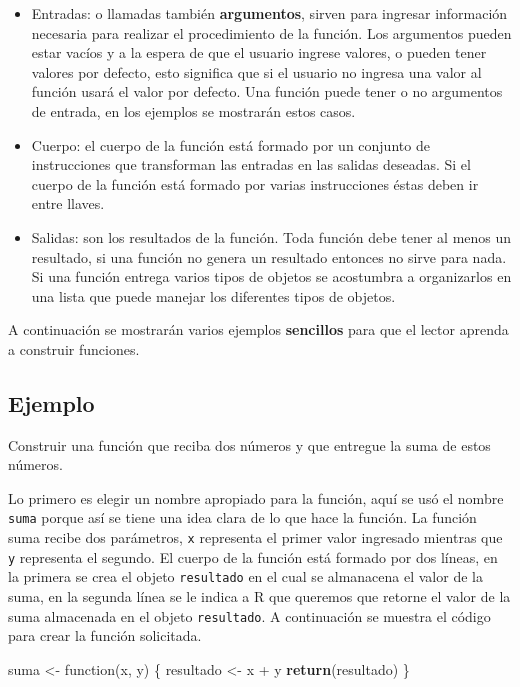 \documentclass[10pt,]{krantz}
\makeatletter
\newenvironment{Shaded}{\begin{snugshade}}{\end{snugshade}}
\newcommand{\KeywordTok}[1]{\textcolor[rgb]{0.13,0.29,0.53}{\textbf{{#1}}}}
\newcommand{\StringTok}[1]{\textcolor[rgb]{0.31,0.60,0.02}{{#1}}}
\newcommand{\NormalTok}[1]{{#1}}
\providecommand{\tightlist}{%
  \setlength{\itemsep}{0pt}\setlength{\parskip}{0pt}}
\let\proglang=\textsf
\newenvironment{kframe}{%
\medskip{}
\setlength{\fboxsep}{.8em}
 \def\at@end@of@kframe{}%
 \ifinner\ifhmode%
  \def\at@end@of@kframe{\end{minipage}}%
  \begin{minipage}{\columnwidth}%
 \fi\fi%
 \def\FrameCommand##1{\hskip\@totalleftmargin \hskip-\fboxsep
 \colorbox{shadecolor}{##1}\hskip-\fboxsep
     \hskip-\linewidth \hskip-\@totalleftmargin \hskip\columnwidth}%
 \MakeFramed {\advance\hsize-\width
   \@totalleftmargin\z@ \linewidth\hsize
   \@setminipage}}%
 {\par\unskip\endMakeFramed%
 \at@end@of@kframe}
\renewenvironment{Shaded}{\begin{kframe}}{\end{kframe}}
\makeatother
\begin{document}
\begin{itemize}
\tightlist
\item
  Entradas: o llamadas también \textbf{argumentos}, sirven para ingresar
  información necesaria para realizar el procedimiento de la función.
  Los argumentos pueden estar vacíos y a la espera de que el usuario
  ingrese valores, o pueden tener valores por defecto, esto significa
  que si el usuario no ingresa una valor al función usará el valor por
  defecto. Una función puede tener o no argumentos de entrada, en los
  ejemplos se mostrarán estos casos.
\item
  Cuerpo: el cuerpo de la función está formado por un conjunto de
  instrucciones que transforman las entradas en las salidas deseadas. Si
  el cuerpo de la función está formado por varias instrucciones éstas
  deben ir entre llaves.
\item
  Salidas: son los resultados de la función. Toda función debe tener al
  menos un resultado, si una función no genera un resultado entonces no
  sirve para nada. Si una función entrega varios tipos de objetos se
  acostumbra a organizarlos en una lista que puede manejar los
  diferentes tipos de objetos.
\end{itemize}

A continuación se mostrarán varios ejemplos \textbf{sencillos} para que
el lector aprenda a construir funciones.

\subsection*{Ejemplo}\label{ejemplo-15}


Construir una función que reciba dos números y que entregue la suma de
estos números.

Lo primero es elegir un nombre apropiado para la función, aquí se usó el
nombre \texttt{suma} porque así se tiene una idea clara de lo que hace
la función. La función suma recibe dos parámetros, \texttt{x} representa
el primer valor ingresado mientras que \texttt{y} representa el segundo.
El cuerpo de la función está formado por dos líneas, en la primera se
crea el objeto \texttt{resultado} en el cual se almanacena el valor de
la suma, en la segunda línea se le indica a \proglang{R} que queremos
que retorne el valor de la suma almacenada en el objeto
\texttt{resultado}. A continuación se muestra el código para crear la
función solicitada.

\begin{Shaded}
\begin{Highlighting}[]
\NormalTok{suma <-}\StringTok{ }\NormalTok{function(x, y) \{}
  \NormalTok{resultado <-}\StringTok{ }\NormalTok{x +}\StringTok{ }\NormalTok{y}
  \KeywordTok{return}\NormalTok{(resultado)}
\NormalTok{\}}
\end{Highlighting}
\end{Shaded}
\end{document}
